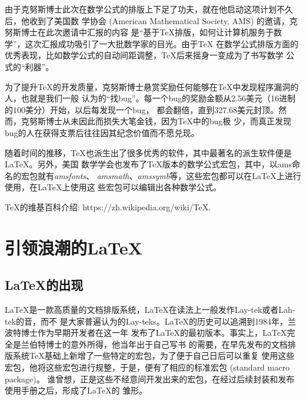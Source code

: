 由于克努斯博士此次在数学公式的排版上下足了功夫，就在他启动这项计划不久后，他收到了美国数
学协会 (American Mathematical Society, AMS) 的邀请，克努斯博士在此次邀请中汇报的内容
是“基于TeX排版，如何让计算机服务于数学”，这次汇报成功吸引了一大批数学家的目光。由于TeX
在数学公式排版方面的优秀表现，比如数学公式的自动间距调整，TeX后来摇身一变成为了书写数学
公式的“利器”。

为了提升TeX的开发质量，克努斯博士悬赏奖励任何能够在TeX中发现程序漏洞的人，也就是我们一般
认为的“找bug”。每一个bug的奖励金额从2.56美元（16进制的100美分）开始，以后每发现一个bug，
都会翻倍，直到327.68美元封顶。然而，克努斯博士从未因此而损失大笔金钱，因为TeX中的bug极
少，而真正发现bug的人在获得支票后往往因其纪念价值而不愿兑现。

随着时间的推移，TeX也派生出了很多优秀的软件，其中最著名的派生软件便是LaTeX。另外，美国
数学学会也发布了TeX版本的数学公式宏包，其中，以ams命名的宏包就有\emph{amsfonts}、
\emph{amsmath}、\emph{amssymb}等，这些宏包都可以在LaTeX上进行使用，在LaTeX上使用这
些宏包可以编辑出各种数学公式。

\begin{tcolorbox}[colback=red!5!white, colframe=red!50!black, title=参考资料]
      TeX的维基百科介绍: https://zh.wikipedia.org/wiki/TeX.
\end{tcolorbox}

\section{引领浪潮的\LaTeX }
\subsection{\LaTeX 的出现}
LaTeX是一款高质量的文档排版系统，LaTeX在读法上一般发作Lay-tek或者Lah-tek的音，而不
是大家普遍认为的Lay-teks。LaTeX的历史可以追溯到1984年，兰波特博士作为早期开发者在这一年
发布了LaTeX的最初版本。事实上，LaTeX完全是兰伯特博士的意外所得，他当年出于自己写书
的需要，在早先发布的文档排版系统TeX基础上新增了一些特定的宏包，为了便于自己日后可以重复
使用这些宏包，他将这些宏包进行规整，于是，便有了相应的标准宏包 (standard macro package)。
谁曾想，正是这些不经意间开发出来的宏包，在经过后续封装和发布使用手册之后，形成了LaTeX的
雏形。

